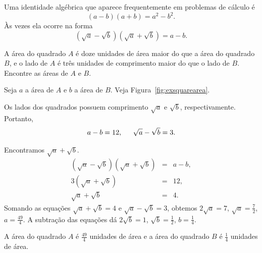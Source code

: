 Uma identidade algébrica que aparece frequentemente em problemas de cálculo
é
$$
  (a - b)(a + b) = a^2 - b^2.
$$
Às vezes ela ocorre na forma
$$
  (\sqrt{a} - \sqrt{b})(\sqrt{a} + \sqrt{b}) = a - b.
$$

\begin{example}
A área do quadrado $A$ é doze unidades de área maior do que a área do
quadrado $B$, e o lado de $A$ é três unidades de comprimento maior do
que o lado de $B$. Encontre as áreas de $A$ e $B$.
\begin{stepanalysis}
\item Seja $a$ a área de $A$ e $b$ a área de $B$. Veja
      Figura~\ref{fig:exsquarearea}.
\item Os lados dos quadrados possuem comprimento $\sqrt{a}$ e $\sqrt{b}$,
      respectivamente. Portanto,
      $$
        a - b = 12, \hspace{1.5em} \sqrt{a} - \sqrt{b} = 3.
      $$
\item Encontramos $\sqrt{a} + \sqrt{b}$.
      \begin{eqnarray*}
        (\sqrt{a} - \sqrt{b})(\sqrt{a} + \sqrt{b}) & = & a - b, \\
        3(\sqrt{a} + \sqrt{b}) & = & 12, \\
        \sqrt{a} + \sqrt{b} & = & 4.
      \end{eqnarray*}
      Somando as equações $\sqrt{a} + \sqrt{b} = 4$ e
      $\sqrt{a} - \sqrt{b} = 3$, obtemos $2\sqrt{a} = 7$, \;
      $\sqrt{a} = \frac{7}{2}$, \; $a = \frac{49}{4}$. A subtração das
      equações dá $2 \sqrt{b} = 1$, \; $\sqrt{b} = \frac{1}{2}$, \;
      $b = \frac{1}{4}$.
\end{stepanalysis}
\begin{interpretsolution}
  A área do quadrado $A$ é $\frac{49}{4}$ unidades de área e a área do
  quadrado $B$ é $\frac{1}{4}$ unidades de área.
\end{interpretsolution}
\end{example}

